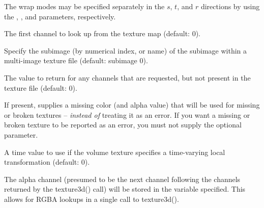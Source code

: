 \documentclass[11pt,letterpaper]{book}
\begin{document}
The wrap modes may be specified separately in the $s$, $t$, and $r$
directions by using the , , and 
parameters, respectively.
\apiend
\vspace{-16pt}

\vspace{12pt}
The first channel to look up from the texture map (default: 0).
\apiend
\vspace{-16pt}

\vspace{12pt}
Specify the subimage (by numerical index, or name) of the subimage
within a multi-image texture file (default: subimage 0).
\apiend
\vspace{-16pt}

\vspace{12pt}
The value to return for any channels that are requested,
but not present in the texture file (default: 0).
\apiend
\vspace{-16pt}

\vspace{12pt}
If present, supplies a missing color (and alpha value) that will
be used for missing or broken textures -- \emph{instead of} treating
it as an error.  If you want a missing or broken texture to be reported
as an error, you must not supply the optional 
parameter.
\apiend
\vspace{-16pt}

\vspace{12pt}
A time value to use if the volume texture specifies a time-varying
local transformation (default: 0).
\apiend
\vspace{-16pt}

\vspace{12pt}
The alpha channel (presumed to be the next channel following the
channels returned by the {\cf texture3d()} call) will be stored in the
variable specified.  This allows for RGBA lookups in a single call to
{\cf texture3d()}.
\apiend
\vspace{-16pt}

\apiend

\end{document}
